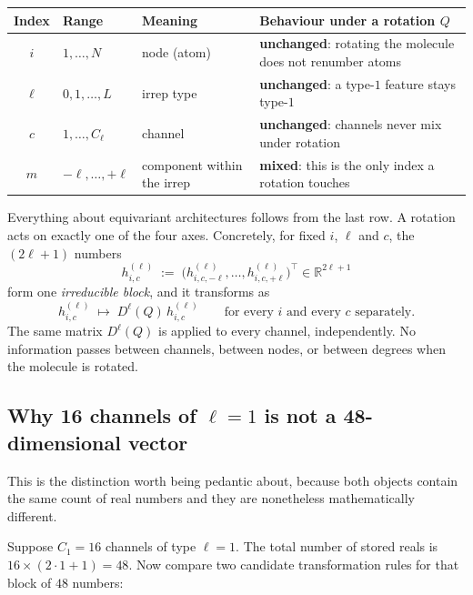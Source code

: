 \documentclass[11pt,a4paper]{report}
\theoremstyle{definition}
\theoremstyle{remark}
\newcommand{\RR}{\mathbb R}
\begin{document}
\begin{center}
\begin{tabular}{cllp{5.2cm}}
\toprule
Index & Range & Meaning & Behaviour under a rotation $Q$ \\
\midrule
$i$ & $1,\dots,N$ & node (atom) & \textbf{unchanged}: rotating the molecule does not renumber atoms \\
$\ell$ & $0,1,\dots,L$ & irrep type & \textbf{unchanged}: a type-$1$ feature stays type-$1$ \\
$c$ & $1,\dots,C_\ell$ & channel & \textbf{unchanged}: channels never mix under rotation \\
$m$ & $-\ell,\dots,+\ell$ & component within the irrep & \textbf{mixed}: this is the only index a rotation touches \\
\bottomrule
\end{tabular}
\end{center}

Everything about equivariant architectures follows from the last row. A
rotation acts on exactly one of the four axes. Concretely, for fixed $i$,
$\ell$ and $c$, the $(2\ell+1)$ numbers
\[
h^{(\ell)}_{i,c}\;:=\;\bigl(h^{(\ell)}_{i,c,-\ell},\dots,h^{(\ell)}_{i,c,+\ell}\bigr)^\top\in\RR^{2\ell+1}
\]
form one \emph{irreducible block}, and it transforms as
\begin{equation}
\label{eq:feature-transform-blockwise}
h^{(\ell)}_{i,c}\;\longmapsto\;D^\ell(Q)\,h^{(\ell)}_{i,c}
\qquad\text{for every } i \text{ and every } c \text{ separately.}
\end{equation}
The same matrix $D^\ell(Q)$ is applied to every channel, independently. No
information passes between channels, between nodes, or between degrees when
the molecule is rotated.

\subsection{Why 16 channels of $\ell=1$ is not a 48-dimensional vector}

This is the distinction worth being pedantic about, because both objects
contain the same count of real numbers and they are nonetheless
mathematically different.

Suppose $C_1=16$ channels of type $\ell=1$. The total number of stored reals
is $16\times(2\cdot1+1)=48$. Now compare two candidate transformation rules
for that block of $48$ numbers:
\end{document}
